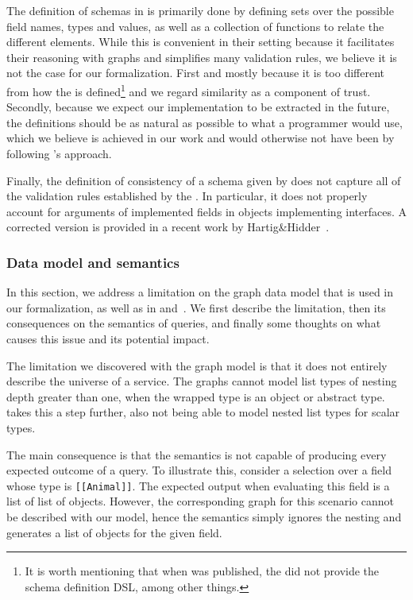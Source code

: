 The definition of \gql schemas in \HP is primarily done by defining sets over the possible field names, types and values, as well as a collection of functions to relate the different elements.
While this is convenient in their setting because it facilitates their reasoning with graphs and simplifies many validation rules, we believe it is not the case for our formalization.
First and mostly because it is too different from how the \spec is defined\footnote{It is worth mentioning that when \HP was published, the \spec did not provide the schema definition DSL, among other things.} and 
we regard similarity as a component of trust. Secondly, because we expect our implementation to be extracted in the future, the definitions should be as natural as possible to what
a programmer would use, which we believe is achieved in our work and would otherwise not have been by following \HP's  approach.

Finally,  the definition of consistency of a schema given by \HP does not capture all of the validation rules established by the \spec. 
In particular, it does not properly account for arguments of implemented fields in objects implementing interfaces. 
A corrected version is provided in a recent work by Hartig\&Hidder~\cite{olafschema}.

\subsubsection*{Data model and semantics}

In this section, we address a limitation on the graph data model that is used in our formalization, as well as in \HP and~\cite{olafschema}.
We first describe the limitation, then its consequences on the semantics of queries, and finally some thoughts on what causes this issue and
its potential impact.

The limitation we discovered with the graph model is that it does not entirely describe the universe of a \gql service. 
The graphs cannot model list types of nesting depth greater than one, when the wrapped type is an object or abstract type. 
\HP takes this a step further, also not being able to model nested list types for scalar types.

The main consequence is that the semantics is not capable of producing every expected outcome of a query. To illustrate this, 
consider a selection over a field whose type is \texttt{[[Animal]]}. 
The expected \gql output when evaluating this field is a list of list of objects.
However, the corresponding graph for this scenario cannot be described with our model, hence the semantics simply ignores the 
nesting and generates a list of objects for the given field.

